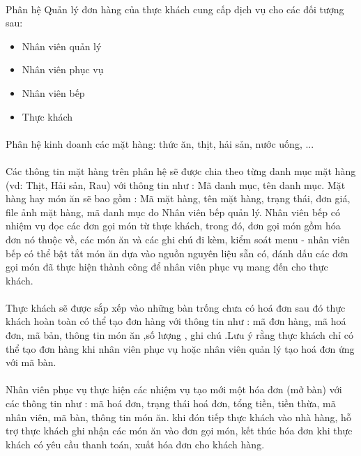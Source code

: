 \documentclass{report}
\begin{document}
	\paragraph{}
	Phân hệ Quản lý đơn hàng của thực khách cung cấp dịch vụ cho các đối tượng sau:
        \begin{itemize}
            \item Nhân viên quản lý
            \item Nhân viên phục vụ
            \item Nhân viên bếp
            \item Thực khách
        \end{itemize}
        \paragraph{}
        Phân hệ kinh doanh các mặt hàng: thức ăn, thịt, hải sản, nước uống, ...

	\paragraph{}
	Các thông tin mặt hàng trên phân hệ
 sẽ được chia theo từng danh mục mặt hàng (vd: Thịt, Hải sản, Rau) với thông tin như : Mã danh mục, tên danh mục. Mặt hàng hay món ăn sẽ bao gồm : Mã mặt hàng, tên mặt hàng,  trạng thái, đơn giá, file ảnh mặt hàng, mã danh mục do Nhân viên bếp quản lý. Nhân viên bếp có nhiệm vụ đọc các đơn gọi món từ thực khách, trong đó, đơn gọi món gồm hóa đơn nó thuộc về, các món ăn và các ghi chú đi kèm, kiểm soát menu - nhân viên bếp có thể bật tắt món ăn dựa vào nguồn nguyên liệu sẵn có, đánh dấu các đơn gọi món đã thực hiện thành công để nhân viên phục vụ mang đến cho thực khách.
	\paragraph{}
	Thực khách sẽ được sắp xếp vào những bàn trống chưa có hoá đơn sau đó thực khách hoàn toàn có thể tạo đơn hàng với thông tin như : mã đơn hàng, mã hoá đơn, mã bản, thông tin món ăn ,số lượng , ghi chú 
    .Lưu ý rằng thực khách chỉ có thể tạo đơn hàng khi nhân viên phục vụ hoặc nhân viên quản lý tạo hoá đơn ứng với mã bàn. 
 \paragraph{}
	Nhân viên phục vụ thực hiện các nhiệm vụ tạo mới một hóa đơn (mở bàn) với các thông tin như : mã hoá đơn, trạng thái hoá đơn, tổng tiền, tiền thừa, mã nhân viên, mã bàn, thông tin món ăn. khi đón tiếp thực khách vào nhà hàng, hỗ trợ thực khách ghi nhận các món ăn vào đơn gọi món, kết thúc hóa đơn khi thực khách có yêu cầu thanh toán, xuất hóa đơn cho khách hàng. 
\end{document}
